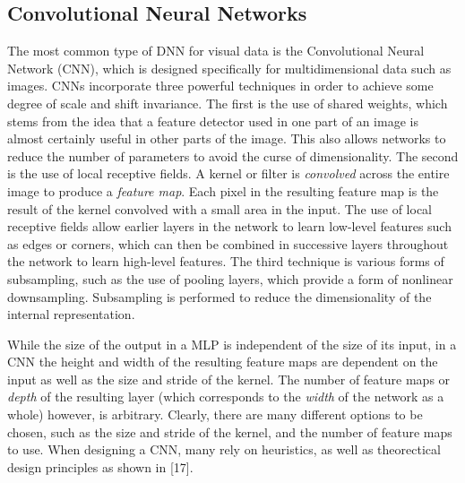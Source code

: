 \documentclass[9pt]{article}
\begin{document}
\subsection{Convolutional Neural Networks}
\noindent The most common type of DNN for visual data is the Convolutional Neural Network (CNN), which is designed specifically for
multidimensional data such as images. CNNs incorporate three powerful techniques in order to achieve some degree of scale and shift invariance.
The first is the use of shared weights, which stems from the idea that a feature detector used in one part of an image is almost certainly useful in
other parts of the image. This also allows networks to reduce the number of parameters to avoid the curse of dimensionality. The second is the use of
local receptive fields. A kernel or filter is \textit{convolved} across the entire
image to produce a \textit{feature map}. Each pixel in the resulting feature map is the result of the kernel convolved with a small area in the input.
The use of local receptive fields allow earlier layers in the network to learn low-level features such as edges or corners, which can then be combined
in successive layers throughout the network to learn high-level features. The third technique is various forms of subsampling, such as the use of pooling
layers, which provide a form of nonlinear downsampling. Subsampling is performed to reduce the dimensionality of the internal representation. \newline

\noindent While the size of the output in a MLP is independent of the size of its input, in a CNN
the height and width of the resulting feature maps are dependent on the input as well as the size and stride of the kernel. The number of feature maps or \textit{depth} of the
resulting layer (which corresponds to the \textit{width} of the network as a whole) however, is arbitrary. Clearly, there are many different options to be chosen,
such as the size and stride of the kernel, and the number of feature maps to use. When designing a CNN, many rely on heuristics, as well as theorectical
design principles as shown in [17]. \newline%

\end{document}
